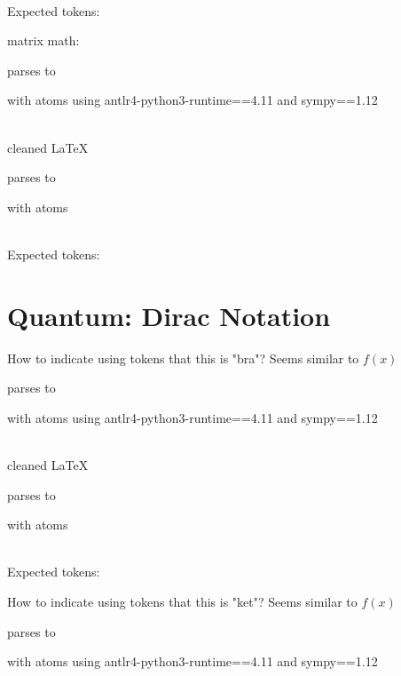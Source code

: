 \documentclass{article}
\begin{document}
\ \\
Expected tokens:



\hrulefill


matrix math:

parses to

with atoms
using antlr4-python3-runtime==4.11 and sympy==1.12

\ \\
cleaned \LaTeX

parses to

with atoms


\ \\
Expected tokens:



\hrulefill


\section{Quantum: Dirac Notation}

How to indicate using tokens that this is "bra"? Seems similar to $f(x)$


parses to

with atoms
using antlr4-python3-runtime==4.11 and sympy==1.12

\ \\
cleaned \LaTeX

parses to

with atoms


\ \\
Expected tokens:



\hrulefill


How to indicate using tokens that this is "ket"? Seems similar to $f(x)$

parses to

with atoms
using antlr4-python3-runtime==4.11 and sympy==1.12
\end{document}
